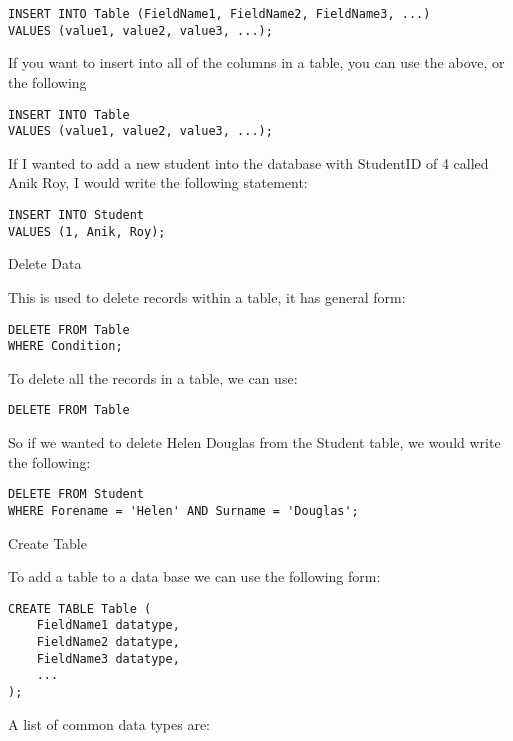 \begin{verbatim}
INSERT INTO Table (FieldName1, FieldName2, FieldName3, ...)
VALUES (value1, value2, value3, ...);
\end{verbatim}

If you want to insert into all of the columns in a table, you can use the above, or the following

\begin{verbatim}
INSERT INTO Table
VALUES (value1, value2, value3, ...);
\end{verbatim}

If I wanted to add a new student into the database with StudentID of 4 called Anik Roy, I would write the following statement:

\begin{verbatim}
INSERT INTO Student
VALUES (1, Anik, Roy);
\end{verbatim}

Delete Data

This is used to delete records within a table, it has general form:

\begin{verbatim}
DELETE FROM Table
WHERE Condition;
\end{verbatim}

To delete all the records in a table, we can use:

\begin{verbatim}
DELETE FROM Table
\end{verbatim}

So if we wanted to delete Helen Douglas from the Student table, we would write the following:

\begin{verbatim}
DELETE FROM Student
WHERE Forename = 'Helen' AND Surname = 'Douglas';
\end{verbatim}

Create Table

To add a table to a data base we can use the following form:

\begin{verbatim}
CREATE TABLE Table (
	FieldName1 datatype,
	FieldName2 datatype,
	FieldName3 datatype,
	...
);
\end{verbatim}

A list of common data types are:

